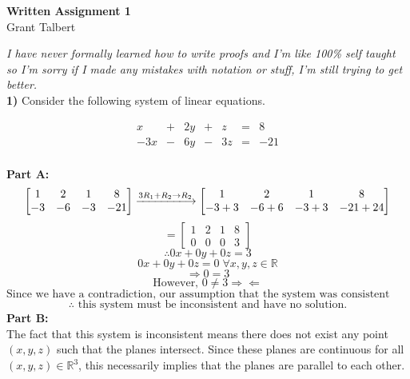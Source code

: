 \documentclass{article}
\newcommand{\R}{\mathbb{R}} %
\begin{document}
\large




\thispagestyle{fancy}
\pagestyle{fancy}
\begin{center}

\textbf{Written Assignment 1}\\
Grant Talbert


\end{center}
\emph{I have never formally learned how to write proofs and I'm like 100\% self taught so I'm sorry if I made any mistakes with notation or stuff, I'm still trying to get better.}\vspace{5mm}\\

\noindent\textbf{1)} Consider the following system of linear equations.  

\[ 
\begin{array}{ccccccc}
x & + &  2y & + & z &  =  & 8	\\
-3x & - & 6y & -  &3z &  =  &  -21\\
\end{array}
\]

\noindent\textbf{Part A:}
$$\begin{bmatrix}
1&2&1&8\\-3&-6&-3&-21
\end{bmatrix}\xlongrightarrow{3R_1+R_2\rightarrow R_2}\begin{bmatrix}
1&2&1&8\\-3+3&-6+6&-3+3&-21+24
\end{bmatrix}$$
$$=\begin{bmatrix}
1&2&1&8\\0&0&0&3
\end{bmatrix}$$
$$\therefore0x+0y+0z=3$$
$$0x+0y+0z=0\;\forall x,y,z\in\R$$
$$\Rightarrow0=3$$
$$\text{However, }0\neq3\Rightarrow\Leftarrow$$
$$\text{Since we have a contradiction, our assumption that the system was consistent must be wrong.}$$
$$\therefore\text{ this system must be inconsistent and have no solution.}$$
\textbf{Part B:}\vspace{1mm}\\
The fact that this system is inconsistent means there does not exist any point $(x,y,z)$ such that the planes intersect. Since these planes are continuous for all $(x,y,z)\in\R^3$, this necessarily implies that the planes are parallel to each other.\vspace{3mm}\\
\end{document}
